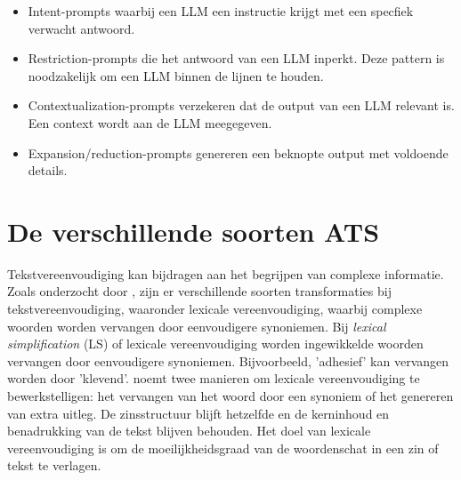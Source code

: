 \begin{itemize}
	\item	Intent-prompts waarbij een LLM een instructie krijgt met een specfiek verwacht antwoord.
	\item	Restriction-prompts die het antwoord van een LLM inperkt. Deze pattern is noodzakelijk om een LLM binnen de lijnen te houden.
	\item 	Contextualization-prompts verzekeren dat de output van een LLM relevant is. Een context wordt aan de LLM meegegeven.
	\item	Expansion/reduction-prompts genereren een beknopte output met voldoende details. 
\end{itemize}

\section{De verschillende soorten ATS}

Tekstvereenvoudiging kan bijdragen aan het begrijpen van complexe informatie. Zoals onderzocht door \textcite{Siddharthan2014}, zijn er verschillende soorten transformaties bij tekstvereenvoudiging, waaronder lexicale vereenvoudiging, waarbij complexe woorden worden vervangen door eenvoudigere synoniemen. Bij \textit{lexical simplification} (LS) of lexicale vereenvoudiging worden ingewikkelde woorden vervangen door eenvoudigere synoniemen. Bijvoorbeeld, 'adhesief' kan vervangen worden door 'klevend'. \textcite{Kandula2010} noemt twee manieren om lexicale vereenvoudiging te bewerkstelligen: het vervangen van het woord door een synoniem of het genereren van extra uitleg. De zinsstructuur blijft hetzelfde en de kerninhoud en benadrukking van de tekst blijven behouden. Het doel van lexicale vereenvoudiging is om de moeilijkheidsgraad van de woordenschat in een zin of tekst te verlagen.

\medspace

